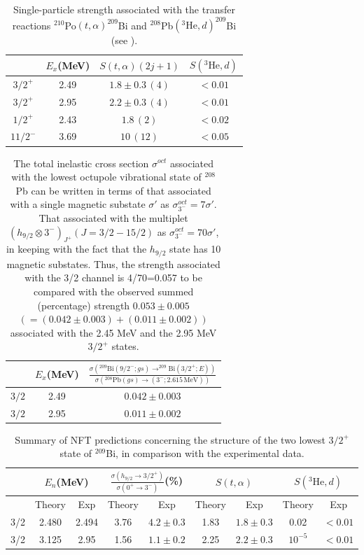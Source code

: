 \begin{table}
	\begin{tabular}{|c|c|c|c|}
		\hline 
		& $E_x$(MeV) & $S(t,\alpha)(2j+1)$ & $S(^3\text{He},d)$ \\
		\hline 
		$3/2^+$ & 2.49 & $1.8\pm0.3\,(4)$  & $<0.01$  \\ 
		$3/2^+$ & 2.95 & $2.2\pm0.3\,(4)$  & $<0.01$ \\ 
		$1/2^+$& 2.43 &  $1.8\,(2)$& $<0.02$ \\ 
		$11/2^-$& 3.69 & $10\,(12)$ &  $<0.05$\\ 
		\hline
	\end{tabular}\caption{Single-particle strength associated with the  transfer reactions  $^{210}$Po$(t,\alpha)^{209}$Bi and $^{208}$Pb$(^3\text{He},d)^{209}$Bi (see \cite{Bortignon:77}).}\label{tabintroC1}
\end{table}
\begin{table}
	\begin{tabular}{|c|c|c|}
		\hline 
		& $E_x$(MeV) & $\frac{\sigma\left(^{209}\text{Bi}(9/2^-;gs)\rightarrow^{209}\text{Bi}(3/2^+;E)\right)}{\sigma\left(^{208}\text{Pb}(gs)\rightarrow (3^-;2.615\, \text{MeV})\right)}$  \\
		\hline 
		$3/2$ & 2.49 & $0.042\pm0.003$   \\ 
		$3/2$ & 2.95 & $0.011\pm0.002$  \\ 
		\hline
	\end{tabular}\caption{The total inelastic cross section $\sigma^{oct}$ associated with the lowest octupole vibrational state of $^{208}$Pb can be written in terms of that associated with a single magnetic substate $\sigma'$ as $\sigma_{3^-}^{oct}=7\sigma'$. That associated with the multiplet $(h_{9/2}\otimes 3^-)_{J^+} (J=3/2-15/2)$ as $\sigma_{3^-}^{oct}=70\sigma'$, in keeping with the fact that the $h_{9/2}$ state has 10 magnetic substates. Thus, the strength associated with the 3/2 channel is 4/70=0.057 to be compared with the observed summed (percentage) strength $0.053\pm0.005 $ $(=(0.042\pm0.003)+(0.011\pm0.002))$ associated with the 2.45 MeV and the 2.95 MeV $3/2^+$ states.}\label{tabintroC2}
\end{table}
\begin{table}
	\begin{tabular}{|c|c|c|c|c|c|c|c|c|}
		\hline
		& \multicolumn{2}{|c}{$E_n$(MeV)} & \multicolumn{2}{|c}{$\frac{\sigma(h_{9/2}\rightarrow 3/2^+)}{\sigma(0^+\rightarrow 3^-)}$(\%)} & \multicolumn{2}{|c}{$S(t,\alpha)$}  & \multicolumn{2}{|c|}{$S(^3\text{He},d)$}   \\
		\hline
		&Theory  & Exp  & Theory  & Exp & Theory & Exp & Theory  & Exp  \\
		\hline
		3/2& 2.480 & 2.494  & 3.76  & $4.2\pm0.3$  & 1.83  & $1.8\pm0.3$ &0.02  & $<0.01$  \\
		3/2& 3.125 & 2.95  & 1.56 & $1.1\pm0.2$  & 2.25  & $2.2\pm0.3$ & $10^{-5}$  & $<0.01$  \\
		\hline
	\end{tabular}\caption{Summary of NFT predictions concerning the structure of the two lowest $3/2^+$ state of $^{209}$Bi, in comparison with the experimental data.}\label{tabintroC3}
\end{table}
